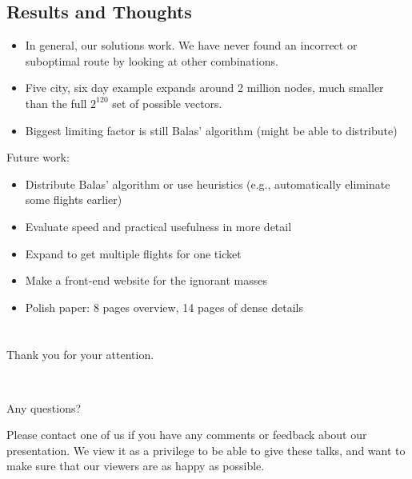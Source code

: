 \documentclass[10pt, xcolor=svgnames]{beamer}
\begin{document}
\subsection{Results and Thoughts}

\begin{frame}
\begin{itemize}
    \item In general, our solutions work. We have never found an incorrect or suboptimal route by looking at other combinations.
    \item Five city, six day example expands around 2 million nodes, much smaller than the full $2^{120}$ set of possible vectors.
    \item Biggest limiting factor is still Balas' algorithm (might be able to distribute)
\end{itemize}
\end{frame}

\begin{frame}
Future work:
\begin{itemize}
    \item Distribute Balas' algorithm or use heuristics (e.g., automatically eliminate some flights earlier)
    \item Evaluate speed and practical usefulness in more detail
    \item Expand to get multiple flights for one ticket
    \item Make a front-end website for the ignorant masses
    \item Polish paper: 8 pages overview, 14 pages of dense details
\end{itemize}
\end{frame}




\section{}
\begin{frame}
\begin{center}
\Large{Thank you for your attention.}

~

\Huge{Any questions?\\}
\end{center}

\begin{center}
Please contact one of us if you have any comments or feedback about our presentation. We view it as a privilege to be able to give these talks, and
want to make sure that our viewers are as happy as possible.
\end{center}
\end{frame}
\end{document}
